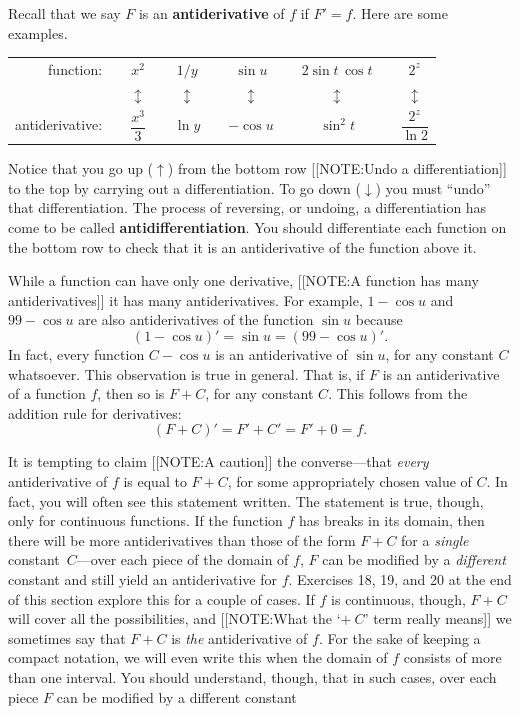Recall that we say $F$ is an {\bf
  antiderivative} of $f$
if $F' = f$.  Here are some examples.
\begin{center}


\begin{tabular}{rcccccccccc}
	{\sc function}: && $x^2$ && $1/y$ && $\sin{u}$ && 
		$2\sin{t} \, \cos{t}$ && $ 2^z$ \\ [3pt]
	&&$\updownarrow$ && $\updownarrow$ && $\updownarrow$ && 
		$\updownarrow$ && $\updownarrow$  \\ [4pt]
	{\sc antiderivative}:&&$\dfrac{x^3}{3}$&& 
		$\ln{y}$ && $-\cos{u}$ && $ \sin^2{t}$ && 
		$\dfrac{2^z}{\ln{2}}$
\end{tabular}

\end{center}
Notice that you go up ($\uparrow$) from the bottom row 
[[NOTE:Undo a differentiation]]
to the top by carrying out a differentiation.
To go down ($\downarrow$) you must ``undo'' that differentiation.  The
process of reversing, or undoing, a differentiation has come to be
called {\bf antidifferentiation}.  You
should differentiate each function on the bottom row to check that it
is an antiderivative of the function above it.


While a function can have only one derivative, 
[[NOTE:A function has  many antiderivatives]]	
it has many antiderivatives.  For example,
$1-\cos{u}$ and $99 - \cos{u}$ are also antiderivatives of the
function $\sin{u}$ because
	\[
(1-\cos{u})' = \sin{u} = (99 - \cos{u})'.
\]
In fact, every function $C - \cos{u}$ is an antiderivative of
$\sin{u}$, for any constant $C$ whatsoever.  This observation is true
in general.  That is, if $F$ is an antiderivative of a function $f$,
then so is $F + C$, for any constant $C$.  This follows from the
addition rule for derivatives:
	\[
(F + C)' = F' + C' = F' + 0 = f.
\]

It is tempting to claim 
[[NOTE:A caution]]
the converse---that {\em every\/} antiderivative of $f$ is equal to $F
+ C$, for some appropriately chosen value of $C$.  In fact, you will
often see this statement written.  The statement is true, though, only
for continuous functions.  If the function $f$ has breaks in its
domain, then there will be more antiderivatives than those of the form
$F+C$ for a {\em single} constant~$C$---over each piece of the domain
of $f$, $F$ can be modified by a {\em different} constant and still
yield an antiderivative for $f$.  Exercises 18, 19, and 20 at the end
of this section explore this for a couple of cases.  If $f$ is
continuous, though, $F + C$ will cover all the possibilities, and
[[NOTE:What the `$+\ C$' term really means]] 
we sometimes say that $F + C$ is {\em the\/} antiderivative of $f$.
For the sake of keeping a compact notation, we will even write this
when the domain of $f$ consists of more than one interval.  You should
understand, though, that in such cases, over each piece $F$ can be
modified by a different constant

